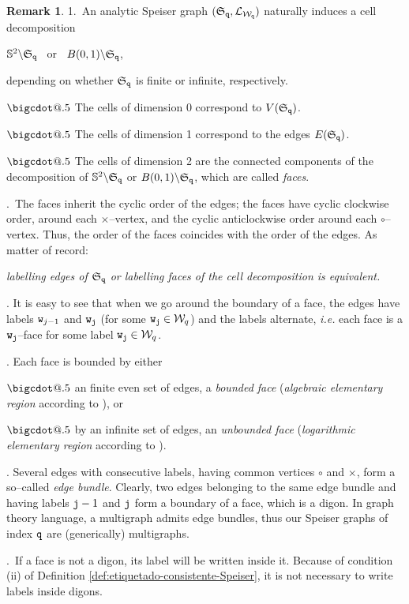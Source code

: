 \documentclass[final,3p,times]{elsarticle}
\makeatletter
\newcommand{\esf}{\ensuremath{{\mathbb S}^2}}
\newcommand*\bigcdot{\mathpalette\bigcdot@{.5}}
\newcommand*\bigcdot@[2]{\mathbin{\vcenter{\hbox{\scalebox{#2}{$\m@th#1\bullet$}}}}}
\theoremstyle{definition}
\newtheorem{remark}[theorem]{Remark}
\makeatother
\begin{document}
\begin{remark}\label{rem:despues-de-def-Speiser-graph}
1.\ 
An analytic Speiser graph $(\mathfrak{S}_{\tt q}, \mathcal{L}_{\mathcal{W}_{\tt q}})$ 
naturally induces a cell decomposition 

\centerline{
$\esf \backslash \mathfrak{S}_{\tt q}$  
\ or \
$B(0,1)\backslash \mathfrak{S}_{\tt q}$,
}


\noindent 
depending on whether $\mathfrak{S}_{\tt q}$ is finite or infinite, respectively.

\noindent
$\bigcdot$ 
The cells of dimension 0 correspond to $V(\mathfrak{S}_{\tt q})$.




\noindent 
$\bigcdot$ The cells of dimension 1 correspond to the edges 
$E(\mathfrak{S}_{\tt q})$.

\noindent 
$\bigcdot$ 
The cells of dimension 2 are the connected components of 
the decomposition 
of $\esf \backslash \mathfrak{S}_{\tt q}$ or
$B(0,1) \backslash \mathfrak{S}_{\tt q}$,
which are called \emph{faces}.

.\ 
The faces inherit the cyclic order of the edges;
the faces have cyclic clockwise order, around each
$\times$--vertex, and the cyclic anticlockwise order 
around each $\circ$--vertex. 
Thus, the order of the faces coincides with 
the order of the edges.  As matter of record:

\centerline{
\emph{labelling edges of $\mathfrak{S}_{\tt q}$ or labelling faces of 
the cell decomposition is equivalent.}
}


.
It is easy to see that when we go around the boundary of a face, 
the edges have labels ${\tt w}_{j-1}$ and ${\tt w}_{\tt j}$ (for some ${\tt w}_{\tt j}\in\mathcal{W}_q$) 
and the labels alternate,
{\it i.e.} each face is a ${\tt w}_{\tt j}$--face for some label ${\tt w}_{\tt j}\in\mathcal{W}_q$.
 
\noindent
4.
Each face is bounded by either  

\noindent 
$\bigcdot$
an finite even set of edges, 
a \emph{bounded face} 
(\emph{algebraic elementary region} according to \cite{GoldbergOstrovskii}),
or 

\noindent
$\bigcdot$ 
by an infinite set of edges, 
an \emph{unbounded face}  
(\emph{logarithmic elementary region} according to \cite{GoldbergOstrovskii}). 


.
Several edges with consecutive labels, 
having common vertices $\circ$ and $\times$, 
form a so--called \emph{edge bundle}. 
Clearly, two edges belonging
to the same edge bundle and having labels ${\tt j}-1$ and ${\tt j}$ form a boundary of a face, which is a digon.
In graph theory language, a multigraph admits edge bundles,
thus our Speiser graphs of index $\tt q$ are 
(generically) multigraphs.

.\ 
If a face is not a digon, 
its label will be written inside it. 
Because of condition (ii) of Definition \ref{def:etiquetado-consistente-Speiser}, 
it is not necessary to write labels inside digons.
\end{remark}
\end{document}
